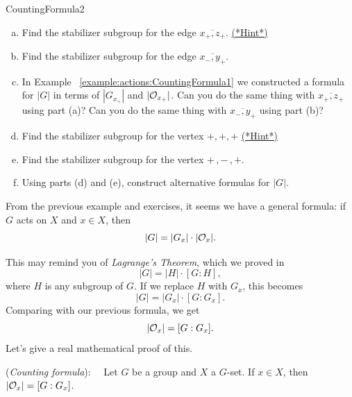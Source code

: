\begin {exercise}{CountingFormula2}
\begin {enumerate}[(a)]
\item Find the stabilizer subgroup for the edge $\overline{x_+,z_+}$. 
\hyperref[sec:actions:hints]{(*Hint*)}
\item Find the stabilizer subgroup for the edge $\overline{x_-,y_+}$.
\item In Example ~\ref {example:actions:CountingFormula1} we constructed a formula for $|G|$ in terms of $| G_{x_+}|$ and $|{\cal O}_{x_+}|$.  Can you do the same thing with $\overline{x_+,z_+}$ using part (a)?  Can you do the same thing with $\overline{x_-,y_+}$ using part (b)?  
\item Find the stabilizer subgroup for the vertex $+,+,+$ 
\hyperref[sec:actions:hints]{(*Hint*)}
\item Find the stabilizer subgroup for the vertex $+\,,-\,,+$. 
\item Using parts (d) and (e), construct alternative formulas for $|G|$.
\end{enumerate}
\end{exercise}

From the previous example and exercises, it seems we have a general formula:  if $G$ acts on $X$ and $x\in X$, then 
$$|G|=|G_x|\cdot|{\cal O}_x|.$$

This may remind you of \emph{Lagrange's Theorem}, which we proved in %
$$|G|=|H|\cdot [G:H], $$
where $H$ is any subgroup of $G$.  If we replace $H$ with $G_x$, this becomes $$|G|=|G_x|\cdot [G:G_x]. $$
Comparing with our previous formula, we get
 $$|{\cal O}_x|=[G:G_x].$$
Let's give a real mathematical proof of this.

\begin{thm}\label{prop:CountingFormula}(\emph{Counting formula}):~~
Let $G$ be a group and $X$ a $G$-set. If $x\in X$,
then $|{\cal O}_x| = [G:G_x]$. 
\end{thm}

